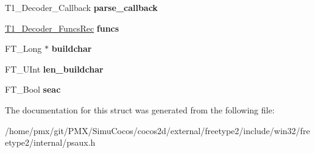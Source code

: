 \begin{DoxyCompactItemize}
\mbox{\label{structT1__DecoderRec___a840af0b01e7adb1e3aa521a936196b62}} 
T1\+\_\+\+Decoder\+\_\+\+Callback {\bfseries parse\+\_\+callback}
\item 
\mbox{\label{structT1__DecoderRec___a6b0f5f7cb3f44e88880aa9c927d79775}} 
\hyperlink{structT1__Decoder__FuncsRec__}{T1\+\_\+\+Decoder\+\_\+\+Funcs\+Rec} {\bfseries funcs}
\item 
\mbox{\label{structT1__DecoderRec___a410abb68fd4260221b3081dc1e258b16}} 
F\+T\+\_\+\+Long $\ast$ {\bfseries buildchar}
\item 
\mbox{\label{structT1__DecoderRec___a55fd1c88d6f7badaec2aa13db17c816f}} 
F\+T\+\_\+\+U\+Int {\bfseries len\+\_\+buildchar}
\item 
\mbox{\label{structT1__DecoderRec___a45bf18b54ff973177ea3061ef0b705c6}} 
F\+T\+\_\+\+Bool {\bfseries seac}
\end{DoxyCompactItemize}


The documentation for this struct was generated from the following file\+:\begin{DoxyCompactItemize}
\item 
/home/pmx/git/\+P\+M\+X/\+Simu\+Cocos/cocos2d/external/freetype2/include/win32/freetype2/internal/psaux.\+h\end{DoxyCompactItemize}
